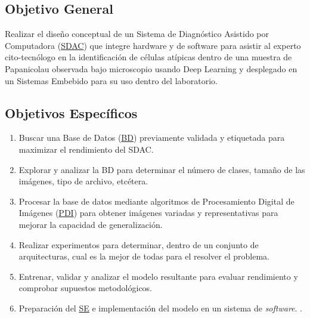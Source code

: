 \subsection{Objetivo General}

Realizar el diseño conceptual de un Sistema de Diagnóstico Asistido por
Computadora (\hyperlink{abbr}{SDAC}) que integre hardware y de software para asistir al
experto cito-tecnólogo en la identificación de células atípicas dentro de una
muestra de Papanicolau observada bajo microscopio usando Deep Learning y
desplegado en un Sistemas Embebido para su uso dentro del laboratorio.

\subsection{Objetivos Específicos}

\begin{enumerate}
    \item Buscar una Base de Datos (\hyperlink{abbr}{BD}) previamente validada y etiquetada para maximizar el rendimiento
    del SDAC.
    \item Explorar y analizar la BD para determinar el número de clases, tamaño
    de las imágenes, tipo de archivo, etcétera. 
    \item Procesar la base de datos mediante algoritmos de Procesamiento Digital
    de Imágenes (\hyperlink{abbr}{PDI}) para obtener imágenes variadas y representativas para mejorar
    la capacidad de generalización.
    \item Realizar experimentos para determinar, dentro de un conjunto de
    arquitecturas, cual es la mejor de todas para el resolver el problema.
    \item Entrenar, validar y analizar el modelo resultante para evaluar
    rendimiento y comprobar supuestos metodológicos.
    \item Preparación del \hyperlink{abbr}{SE} e implementación del modelo en un
    sistema de \emph{software}. .
\end{enumerate}